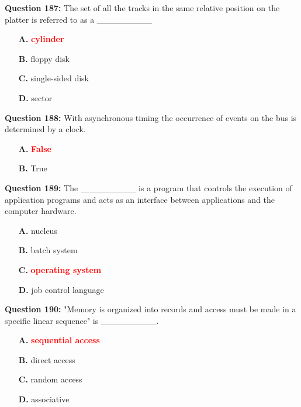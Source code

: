 \documentclass[12pt,a4paper]{article}
\begin{document}
\vspace{0.5cm}

\textbf{Question 187:} The set of all the tracks in the same relative position on the platter is referred to as a _________

\begin{itemize}
    \item[\textbf{A.}] \textcolor{red}{\textbf{cylinder}}
    \item[\textbf{B.}] floppy disk
    \item[\textbf{C.}] single-sided disk
    \item[\textbf{D.}] sector
\end{itemize}

\vspace{0.5cm}

\textbf{Question 188:} With asynchronous timing the occurrence of events on the bus is determined by a clock.

\begin{itemize}
    \item[\textbf{A.}] \textcolor{red}{\textbf{False}}
    \item[\textbf{B.}] True
\end{itemize}

\vspace{0.5cm}

\textbf{Question 189:} The _________ is a program that controls the execution of application programs and acts as an interface between applications and the computer hardware.

\begin{itemize}
    \item[\textbf{A.}] nucleus
    \item[\textbf{B.}] batch system
    \item[\textbf{C.}] \textcolor{red}{\textbf{operating system}}
    \item[\textbf{D.}] job control language
\end{itemize}

\vspace{0.5cm}

\textbf{Question 190:} "Memory is organized into records and access must be made in a specific linear sequence" is _________.

\begin{itemize}
    \item[\textbf{A.}] \textcolor{red}{\textbf{sequential access}}
    \item[\textbf{B.}] direct access
    \item[\textbf{C.}] random access
    \item[\textbf{D.}] associative
\end{itemize}
\end{document}

